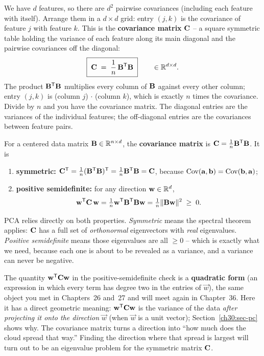 We have $d$ features, so there are $d^2$ pairwise covariances (including each
feature with itself). Arrange them in a $d\times d$ grid: entry $(j,k)$ is the
covariance of feature $j$ with feature $k$. This is the \textbf{covariance matrix}
$\mathbf{C}$ -- a square symmetric table holding the variance of each feature along its
main diagonal and the pairwise covariances off the diagonal:
\[
  \boxed{\;\mathbf{C} \;=\; \frac{1}{n}\,\mathbf{B}^{\mathsf{T}} \mathbf{B}\;}
  \qquad\in\mathbb{R}^{d\times d}.
\]
The product $\mathbf{B}^{\mathsf{T}}\mathbf{B}$ multiplies every column of $\mathbf{B}$ against every
other column; entry $(j,k)$ is (column $j$) $\cdot$ (column $k$), which is exactly
$n$ times the covariance. Divide by $n$ and you have the covariance matrix. The
diagonal entries are the variances of the individual features; the off-diagonal
entries are the covariances between feature pairs.

\begin{formalbox}
For a centered data matrix $\mathbf{B}\in\mathbb{R}^{n\times d}$, the \textbf{covariance
matrix} is $\mathbf{C}=\tfrac1n\mathbf{B}^{\mathsf{T}}\mathbf{B}$. It is
\begin{enumerate}
  \item \textbf{symmetric:} $\mathbf{C}^{\mathsf{T}}=\tfrac1n(\mathbf{B}^{\mathsf{T}}\mathbf{B})^{\mathsf{T}}=\tfrac1n\mathbf{B}^{\mathsf{T}}\mathbf{B}=\mathbf{C}$,
        because $\operatorname{Cov}(\mathbf{a},\mathbf{b})=\operatorname{Cov}(\mathbf{b},\mathbf{a})$;
  \item \textbf{positive semidefinite:} for any direction $\mathbf{w}\in\mathbb{R}^d$,
        \[
          \mathbf{w}^{\mathsf{T}}\mathbf{C}\,\mathbf{w}=\tfrac1n\mathbf{w}^{\mathsf{T}}\mathbf{B}^{\mathsf{T}}\mathbf{B}\mathbf{w}
          =\tfrac1n\lVert\mathbf{B}\mathbf{w}\rVert^2\;\ge\;0 .
        \]
\end{enumerate}
\end{formalbox}

PCA relies directly on both properties.
\emph{Symmetric} means the spectral theorem applies: $\mathbf{C}$ has a full set of
\emph{orthonormal} eigenvectors with \emph{real} eigenvalues. \emph{Positive
semidefinite} means those eigenvalues are all $\ge 0$ -- which is exactly what we
need, because each one is about to be revealed as a variance, and a variance can
never be negative.

\begin{connectionbox}
The quantity $\mathbf{w}^{\mathsf{T}}\mathbf{C}\mathbf{w}$ in the positive-semidefinite check is a
\textbf{quadratic form} (an expression in which every term has degree two in the
entries of $\vec w$), the same object you met in Chapters~26 and~27
and will meet again in Chapter~36. Here it has a direct geometric meaning: $\mathbf{w}^{\mathsf{T}}\mathbf{C}\mathbf{w}$ is the variance of the data \emph{after projecting it onto the direction}
$\vec w$ (when $\vec w$ is a unit vector); Section~\ref{ch30:sec-pc} shows why. The
covariance matrix turns a direction into ``how much does the cloud spread that way.''
Finding the direction where that spread is largest will turn out to be an eigenvalue
problem for the symmetric matrix $\mathbf{C}$.
\end{connectionbox}

